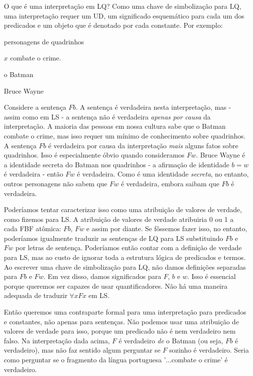 O que é uma interpretação em LQ? Como uma chave de simbolização para LQ, uma interpretação requer um UD, um significado esquemático para cada um dos predicados e um objeto que é denotado por cada constante. Por exemplo:
\begin{ekey}
\item[UD:] personagens de quadrinhos
\item[Fx:] $x$ combate o crime.
\item[b:] o Batman
\item[w:] Bruce Wayne
\end{ekey}
Considere a sentença $Fb$. A sentença é verdadeira nesta interpretação, mas - assim como em LS - a sentença não é verdadeira \emph{apenas por causa} da interpretação. A maioria das pessoas em nossa cultura sabe que o Batman combate o crime, mas isso requer um mínimo de conhecimento sobre quadrinhos. A sentença $Fb$ é verdadeira por causa da interpretação \emph{mais} alguns fatos sobre quadrinhos. Isso é especialmente óbvio quando consideramos $Fw$. Bruce Wayne é a identidade secreta do Batman nos quadrinhos - a afirmação de identidade $b=w$ é verdadeira - então $Fw$ é verdadeira. Como é uma identidade \emph{secreta}, no entanto, outros personagens não sabem que $Fw$ é verdadeira, embora saibam que $Fb$ é verdadeira.

Poderíamos tentar caracterizar isso como uma atribuição de valores de verdade, como fizemos para LS. A atribuição de valores de verdade atribuiria 0 ou 1 a cada FBF atômica: $Fb$, $Fw$ e assim por diante. Se fôssemos fazer isso, no entanto, poderíamos igualmente traduzir as sentenças de LQ para LS substituindo $Fb$ e $Fw$ por letras de sentença. Poderíamos então contar com a definição de verdade para LS, mas ao custo de ignorar toda a estrutura lógica de predicados e termos. Ao escrever uma chave de simbolização para LQ, não damos definições separadas para $Fb$ e $Fw$. Em vez disso, damos significados para $F$, $b$ e $w$. Isso é essencial porque queremos ser capazes de usar quantificadores. Não há uma maneira adequada de traduzir $\forall x Fx$ em LS.

Então queremos uma contraparte formal para uma interpretação para predicados e constantes, não apenas para sentenças. Não podemos usar uma atribuição de valores de verdade para isso, porque um predicado não é nem verdadeiro nem falso. Na interpretação dada acima, $F$ é verdadeiro \emph{de} o Batman (ou seja, $Fb$ é verdadeiro), mas não faz sentido algum perguntar se $F$ sozinho é verdadeiro. Seria como perguntar se o fragmento da língua portuguesa '$\ldots$combate o crime' é verdadeiro.


